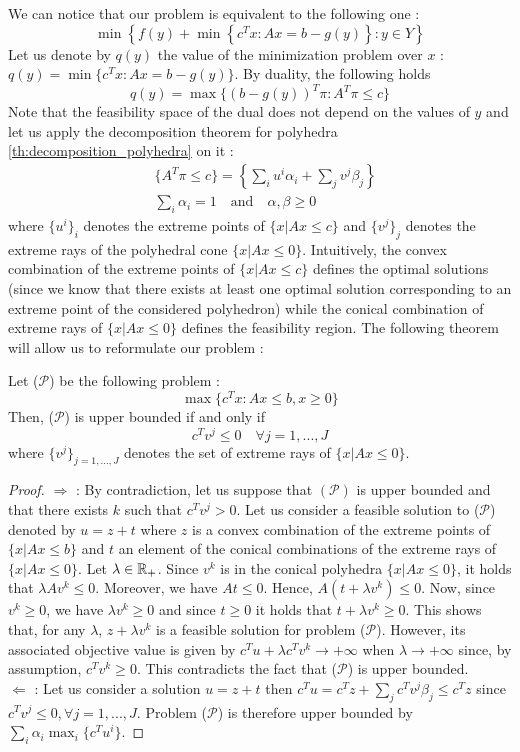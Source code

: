 We can notice that our problem is equivalent to the following one : \[
    \min\left\{ f(y) + \min\left\{ c^Tx : Ax = b - g(y) \right\} : y \in Y \right\}
\] Let us denote by $q(y)$ the value of the minimization problem over $x$ : $q(y) = \min\{ c^Tx : Ax = b - g(y) \}$. By duality, the following holds \[
    q(y) = \max\{ (b-g(y))^T\pi : A^T\pi \le c \}
\] Note that the feasibility space of the dual does not depend on the values of $y$ and let us apply the decomposition theorem for polyhedra \ref{th:decomposition_polyhedra} on it :
\begin{align*}
    &\{ A^T\pi \le c \} = \left\{ \sum_i u^i\alpha_i + \sum_j v^j\beta_j \right\} \\
    &\sum_i \alpha_i = 1 \quad\textrm{and}\quad \alpha, \beta \ge 0
\end{align*} where $\{u^i\}_i$ denotes the extreme points of $\{x|Ax\le c\}$ and $\{v^j\}_j$ denotes the extreme rays of the polyhedral cone $\{x|Ax\le 0\}$. Intuitively, the convex combination of the extreme points of $\{x|Ax\le c\}$ defines the optimal solutions (since we know that there exists at least one optimal solution corresponding to an extreme point of the considered polyhedron) while the conical combination of extreme rays of $\{x|Ax\le 0\}$ defines the feasibility region. The following theorem will allow us to reformulate our problem :
\begin{theorem}
    Let ($\mathcal P$) be the following problem : \[ \max\{ c^Tx : Ax \le b, x\ge 0 \} \tag{$\mathcal P$} \] Then, ($\mathcal P$) is upper bounded if and only if 
    \[ c^Tv^j \le 0\quad \forall j=1,...,J \]
    where $\{v^j\}_{j=1,...,J}$ denotes the set of extreme rays of $\{x|Ax\le 0\}$. 
\end{theorem}
\begin{proof}
$\Rightarrow$ : By contradiction, let us suppose that $(\mathcal P)$ is upper bounded and that there exists $k$ such that $c^Tv^j > 0$. Let us consider a feasible solution to ($\mathcal P$) denoted by $u = z + t$ where $z$ is a convex combination of the extreme points of $\{x|Ax\le b\}$ and $t$ an element of the conical combinations of the extreme rays of $\{x|Ax\le 0\}$. Let $\lambda\in\mathbb R_+$. Since $v^k$ is in the conical polyhedra $\{x|Ax\le 0\}$, it holds that $\lambda Av^k\le 0$. Moreover, we have $At\le 0$. Hence, $A(t+\lambda v^k)\le 0$. Now, since $v^k\ge 0$, we have $\lambda v^k\ge 0$ and since $t\ge 0$ it holds that $t+\lambda v^k\ge 0$. This shows that, for any $\lambda$, $z+\lambda v^k$ is a feasible solution for problem ($\mathcal P$). However, its associated objective value is given by $c^Tu + \lambda c^Tv^k\rightarrow +\infty$ when $\lambda\rightarrow+\infty$ since, by assumption, $c^Tv^k\ge 0$. This contradicts the fact that ($\mathcal P$) is upper bounded. \\
$\Leftarrow$ : Let us consider a solution $u = z + t$ then $c^Tu = c^Tz + \sum_j c^Tv^j\beta_j \le c^Tz$ since $c^Tv^j\le 0, \forall j=1,...,J$. Problem ($\mathcal P$) is therefore upper bounded by $\sum_i \alpha_i \max_i\{ c^Tu^i \}$. 
\end{proof}